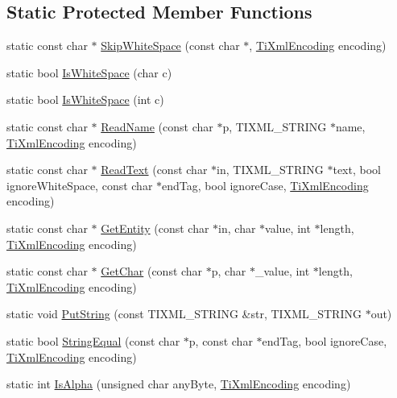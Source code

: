 \subsection*{Static Protected Member Functions}
\begin{DoxyCompactItemize}
\item 
static const char $\ast$ \hyperlink{class_ti_xml_base_ac0c3d66d8a9e6996a1fa016275e16875}{SkipWhiteSpace} (const char $\ast$, \hyperlink{tinyxml_8h_a88d51847a13ee0f4b4d320d03d2c4d96}{TiXmlEncoding} encoding)
\item 
static bool \hyperlink{class_ti_xml_base_af56296d561c0bab4bc8e198cdcf5c48e}{IsWhiteSpace} (char c)
\item 
static bool \hyperlink{class_ti_xml_base_a3de391ea9f4c4a8aa10d04480b048795}{IsWhiteSpace} (int c)
\item 
static const char $\ast$ \hyperlink{class_ti_xml_base_a1c21a6ab5f7b503acd91f35f183734b3}{ReadName} (const char $\ast$p, TIXML\_\-STRING $\ast$name, \hyperlink{tinyxml_8h_a88d51847a13ee0f4b4d320d03d2c4d96}{TiXmlEncoding} encoding)
\item 
static const char $\ast$ \hyperlink{class_ti_xml_base_aa646c74921aa33156968b802bbf5566e}{ReadText} (const char $\ast$in, TIXML\_\-STRING $\ast$text, bool ignoreWhiteSpace, const char $\ast$endTag, bool ignoreCase, \hyperlink{tinyxml_8h_a88d51847a13ee0f4b4d320d03d2c4d96}{TiXmlEncoding} encoding)
\item 
static const char $\ast$ \hyperlink{class_ti_xml_base_ac5c08bf3deffcda0bf8ce2958372b584}{GetEntity} (const char $\ast$in, char $\ast$value, int $\ast$length, \hyperlink{tinyxml_8h_a88d51847a13ee0f4b4d320d03d2c4d96}{TiXmlEncoding} encoding)
\item 
static const char $\ast$ \hyperlink{class_ti_xml_base_a5b0fde72d6f662ae1fd6303195d2159b}{GetChar} (const char $\ast$p, char $\ast$\_\-value, int $\ast$length, \hyperlink{tinyxml_8h_a88d51847a13ee0f4b4d320d03d2c4d96}{TiXmlEncoding} encoding)
\item 
static void \hyperlink{class_ti_xml_base_a283ddc4f1f53a53e7111eff4e12a63d9}{PutString} (const TIXML\_\-STRING \&str, TIXML\_\-STRING $\ast$out)
\item 
static bool \hyperlink{class_ti_xml_base_a51631e6986179558b9e5850723ed165a}{StringEqual} (const char $\ast$p, const char $\ast$endTag, bool ignoreCase, \hyperlink{tinyxml_8h_a88d51847a13ee0f4b4d320d03d2c4d96}{TiXmlEncoding} encoding)
\item 
static int \hyperlink{class_ti_xml_base_ae22522b2e8e1ac43102d16394f639fc8}{IsAlpha} (unsigned char anyByte, \hyperlink{tinyxml_8h_a88d51847a13ee0f4b4d320d03d2c4d96}{TiXmlEncoding} encoding)

\end{DoxyCompactItemize}
